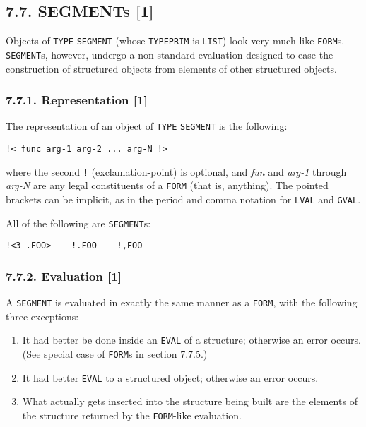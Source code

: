 \documentclass[a4paper,]{article}
\providecommand{\tightlist}{%
  \setlength{\itemsep}{0pt}\setlength{\parskip}{0pt}}
\begin{document}
\subsection{7.7. SEGMENTs {[}1{]}}\label{segments-1}

Objects of \texttt{TYPE} \texttt{SEGMENT} (whose \texttt{TYPEPRIM} is \texttt{LIST}) look
very much like \texttt{FORM}s. \texttt{SEGMENT}s, however, undergo a non-standard evaluation designed to ease the
construction of structured objects from elements of other structured objects.

\subsubsection{7.7.1. Representation {[}1{]}}\label{representation-1-2}

The representation of an object of \texttt{TYPE} \texttt{SEGMENT} is the following:

\begin{verbatim}
!< func arg-1 arg-2 ... arg-N !>
\end{verbatim}

 where the second \texttt{!} (exclamation-point) is optional, and
\emph{fun} and \emph{arg-1} through \emph{arg-N} are any legal constituents of a \texttt{FORM} (that is, anything). The
pointed brackets can be implicit, as in the period and comma notation for \texttt{LVAL} and \texttt{GVAL}.

All of the following are \texttt{SEGMENT}s:

\begin{verbatim}
!<3 .FOO>    !.FOO    !,FOO
\end{verbatim}


\subsubsection{7.7.2. Evaluation {[}1{]}}\label{evaluation-1-1}

A \texttt{SEGMENT} is evaluated in exactly the same manner as a \texttt{FORM}, with the following three exceptions:

\begin{enumerate}
\def\labelenumi{\arabic{enumi}.}
\tightlist
\item
  It had better be done inside an \texttt{EVAL} of a structure; otherwise an error occurs. (See special case of
  \texttt{FORM}s in section 7.7.5.)
\item
  It had better \texttt{EVAL} to a structured object; otherwise an error occurs.
\item
  What actually gets inserted into the structure being built are the elements of the structure returned by the
  \texttt{FORM}-like evaluation.
\end{enumerate}
\end{document}
